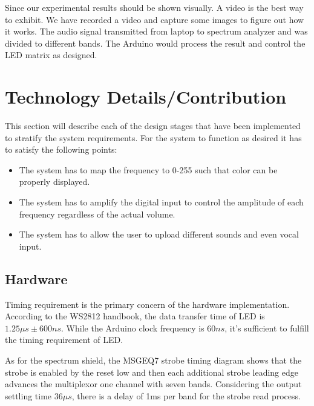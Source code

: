 \documentclass[12pt,a4paper,journal]{IEEEtran}
\begin{document}
Since our experimental results should be shown visually. A video is the best way to exhibit. We have recorded a video and  capture some images to figure out how it works. The audio signal transmitted from laptop to spectrum analyzer and was divided to different bands. The Arduino would process the result and control the LED matrix as designed. 

\section{Technology Details/Contribution}
This section will describe each of the design stages that have been implemented to stratify the system requirements. 
For the system to function as desired it has to satisfy the following points:
\begin{itemize}
\item The system has to map the frequency to 0-255 such that color can be properly displayed.
\item The system has to amplify the digital input to control the amplitude of each frequency regardless of the actual volume.
\item The system has to allow the user to upload different sounds and even vocal input.
\end{itemize}
\subsection{Hardware}
Timing requirement is the primary concern of the hardware implementation. According to the WS2812 handbook, the data transfer time of LED is $1.25\mu s \pm 600ns$. While the Arduino clock frequency is $60ns$, it's sufficient to fulfill the timing requirement of LED.

As for the spectrum shield, the MSGEQ7 strobe timing diagram shows that the strobe is enabled by the reset low and then each additional strobe leading edge advances the multiplexor one channel with seven bands. Considering the output settling time $36\mu s$, there is a delay of 1ms per band for the strobe read process.
\end{document}
